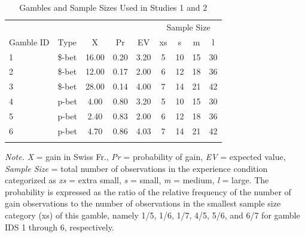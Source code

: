 \documentclass[a4paper, man, natbib, floatsintext]{apa6} %
\begin{document}
\begin{table}[bth]
\begin{center}
\begin{threeparttable}
\caption{Gambles and Sample Sizes Used in Studies 1 and 2\label{table:Lotteries}}
\begin{tabular}{llccccccc}
\toprule
 &  &  &  &  & \multicolumn{4}{c}{Sample Size} \\
\cmidrule(r){6-9}
Gamble ID & Type & X & Pr & EV & xs & s & m & l\\
\midrule
1 & \$-bet & 16.00 & 0.20 & 3.20 & 5 & 10 & 15 & 30\\
2 & \$-bet & 12.00 & 0.17 & 2.00 & 6 & 12 & 18 & 36\\
3 & \$-bet & 28.00 & 0.14 & 4.00 & 7 & 14 & 21 & 42\\
4 & p-bet & 4.00 & 0.80 & 3.20 & 5 & 10 & 15 & 30\\
5 & p-bet & 2.40 & 0.83 & 2.00 & 6 & 12 & 18 & 36\\
6 & p-bet & 4.70 & 0.86 & 4.03 & 7 & 14 & 21 & 42\\
\bottomrule
\addlinespace
\end{tabular}
\begin{tablenotes}[para]
\normalsize{\textit{Note.} \textit{X} = gain in Swiss Fr., \textit{Pr} = probability of gain, \textit{EV} = expected value, \textit{Sample Size} = total number of observations in the experience condition categorized as \textit{xs} = extra small, \textit{s} = small, \textit{m} = medium, \textit{l} = large. The probability is expressed as the ratio of the relative frequency of the number of gain observations to the number of observations in the smallest sample size category (xs) of this gamble, namely 1/5, 1/6, 1/7, 4/5, 5/6, and 6/7 for gamble IDS 1 through 6, respectively.}
\end{tablenotes}
\end{threeparttable}
\end{center}
\end{table}
\end{document}
